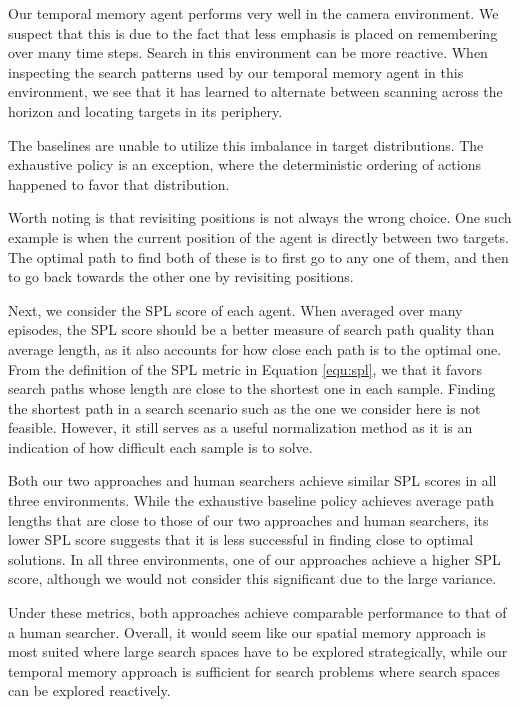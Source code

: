 Our temporal memory agent performs very well in the camera environment.
We suspect that this is due to the fact that less emphasis is placed on remembering over many time steps.
Search in this environment can be more reactive.
When inspecting the search patterns used by our temporal memory agent in this environment, we see that it has learned to alternate between scanning across the horizon and locating targets in its periphery.

The baselines are unable to utilize this imbalance in target distributions.
The exhaustive policy is an exception, where the deterministic ordering of actions happened to favor that distribution. 

Worth noting is that revisiting positions is not always the wrong choice.
One such example is when the current position of the agent is directly between two targets.
The optimal path to find both of these is to first go to any one of them, and then to go back towards the other one by revisiting positions.

Next, we consider the SPL score of each agent.
When averaged over many episodes, the SPL score should be a better measure of search path quality than average length, as it also accounts for how close each path is to the optimal one.
From the definition of the SPL metric in Equation \ref{equ:spl}, we that it favors search paths whose length are close to the shortest one in each sample.
Finding the shortest path in a search scenario such as the one we consider here is not feasible.
However, it still serves as a useful normalization method as it is an indication of how difficult each sample is to solve.

Both our two approaches and human searchers achieve similar SPL scores in all three environments.
While the exhaustive baseline policy achieves average path lengths that are close to those of our two approaches and human searchers, its lower SPL score suggests that it is less successful in finding close to optimal solutions.
In all three environments, one of our approaches achieve a higher SPL score,
although we would not consider this significant due to the large variance.

Under these metrics, both approaches achieve comparable performance to that of a human searcher.
Overall, it would seem like our spatial memory approach is most suited where large search spaces have to be explored strategically, while our temporal memory approach is sufficient for search problems where search spaces can be explored reactively.

